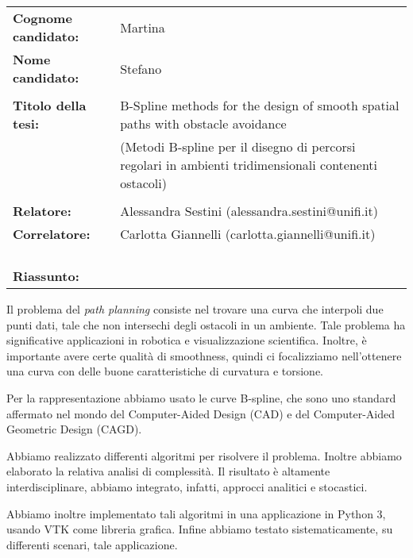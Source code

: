 \documentclass{letter}
\begin{document}
\begin{tabular}{ll}
  \textbf{Cognome candidato: }& Martina\\
  \textbf{Nome candidato: }& Stefano\\
  &\\
  \textbf{Titolo della tesi: }& B-Spline methods for the design of smooth spatial
  paths with obstacle avoidance\\
  &\small(Metodi B-spline per il disegno di percorsi
  regolari in ambienti tridimensionali contenenti ostacoli)\\
  &\\
  \textbf{Relatore: }& Alessandra Sestini (alessandra.sestini@unifi.it)\\
  \textbf{Correlatore: }& Carlotta Giannelli
                          (carlotta.giannelli@unifi.it)\\
  &\\
  &\\
  &\\
  &\\
  \textbf{Riassunto: }&
\end{tabular}

\begin{center}
  \begin{minipage}{0.7\linewidth}
    Il problema del \emph{path planning} consiste nel trovare una curva
    che interpoli due punti dati, tale che non intersechi degli ostacoli in
    un ambiente. Tale problema ha significative applicazioni in robotica e
    visualizzazione scientifica. Inoltre, \`e importante avere
    certe qualit\`a di smoothness, quindi ci focalizziamo
    nell'ottenere una curva con delle buone caratteristiche di
    curvatura e torsione.

    Per la rappresentazione abbiamo usato le curve B-spline, che sono
    uno standard affermato nel mondo del Computer-Aided Design (CAD) e
    del Computer-Aided Geometric Design (CAGD).

    Abbiamo realizzato differenti algoritmi per risolvere il
    problema. Inoltre abbiamo elaborato la relativa analisi di
    complessit\`a. Il risultato \`e altamente interdisciplinare,
    abbiamo integrato, infatti, approcci analitici e stocastici.

    Abbiamo inoltre implementato tali algoritmi in una applicazione in
    Python 3, usando VTK come libreria grafica. Infine abbiamo testato
    sistematicamente, su differenti scenari, tale applicazione.
  \end{minipage}
\end{center}
\end{document}
